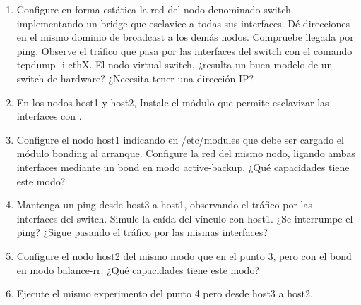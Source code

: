 \begin{enumerate}
	\item Configure en forma estática la red del nodo denominado switch implementando un bridge que esclavice a todas sus interfaces. Dé direcciones en el mismo dominio de broadcast a los demás nodos. Compruebe llegada por ping. Observe el tráfico que pasa por las interfaces del switch con el comando tcpdump -i ethX. El nodo virtual switch, ¿resulta un buen modelo de un switch de hardware? ¿Necesita tener una dirección IP? 
	\item En los nodos host1 y host2, Instale el módulo que permite esclavizar las interfaces con .
	\item Configure el nodo host1 indicando en /etc/modules que debe ser cargado el módulo bonding al arranque. Configure la red del mismo nodo, ligando ambas interfaces mediante un bond en modo active-backup. ¿Qué capacidades tiene este modo?
	\item Mantenga un ping desde host3 a host1, observando el tráfico por las interfaces del switch. Simule la caída del vínculo con host1.  ¿Se interrumpe el ping? ¿Sigue pasando el tráfico por las mismas interfaces?
	\item Configure el nodo host2 del mismo modo que en el punto 3, pero con el bond en modo balance-rr. ¿Qué capacidades tiene este modo?
	\item Ejecute el mismo experimento del punto 4 pero desde host3 a host2. 
\end{enumerate}


